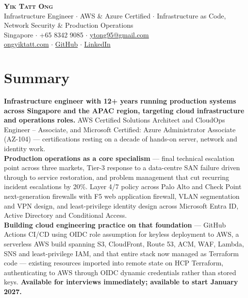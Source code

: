 \documentclass[a4paper,10pt]{article}
\begin{document}
\begin{center}
    \vspace*{-18pt}
    \textbf{\Huge \scshape Yik Tatt Ong} \\[3pt]
    \small Infrastructure Engineer $\cdot$ AWS \& Azure Certified $\cdot$ Infrastructure as Code, Network Security \& Production Operations \\[1pt]
    \small Singapore $\cdot$ +65 8342 9085 $\cdot$
    \href{mailto:ytong95@gmail.com}{ytong95@gmail.com} \\[1pt]
    \small \href{https://ongyiktatt.com}{ongyiktatt.com} $\cdot$
    \href{https://github.com/ongyiktatt}{GitHub} $\cdot$
    \href{https://www.linkedin.com/in/ongyiktatt/}{LinkedIn}
    \vspace*{-6pt}
\end{center}
\section{Summary}
\begin{itemize}[leftmargin=0.15in, label={}]
    \small{\item{
     \textbf{Infrastructure engineer with 12+ years running production systems across Singapore and the APAC region, targeting cloud infrastructure and operations roles.} AWS Certified Solutions Architect and CloudOps Engineer -- Associate, and Microsoft Certified: Azure Administrator Associate (AZ-104) --- certifications resting on a decade of hands-on server, network and identity work. \\
     \textbf{Production operations as a core specialism} --- final technical escalation point across three markets, Tier-3 response to a data-centre SAN failure driven through to service restoration, and problem management that cut recurring incident escalations by 20\%. Layer 4/7 policy across Palo Alto and Check Point next-generation firewalls with F5 web application firewall, VLAN segmentation and VPN design, and least-privilege identity design across Microsoft Entra ID, Active Directory and Conditional Access. \\
     \textbf{Building cloud engineering practice on that foundation} --- GitHub Actions CI/CD using OIDC role assumption for keyless deployment to AWS, a serverless AWS build spanning S3, CloudFront, Route 53, ACM, WAF, Lambda, SNS and least-privilege IAM, and that entire stack now managed as Terraform code --- existing resources imported into remote state on HCP Terraform, authenticating to AWS through OIDC dynamic credentials rather than stored keys. \textbf{Available for interviews immediately; available to start January 2027.}
     \vspace{-6pt}
    }}
\end{itemize}
\end{document}
